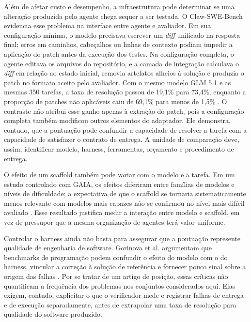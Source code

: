 Além de afetar custo e desempenho, a infraestrutura pode determinar se uma alteração produzida pelo agente chega sequer a ser testada. O Claw-SWE-Bench evidencia esse problema na interface entre agente e avaliador. Em sua configuração mínima, o modelo precisava escrever um \emph{diff} unificado na resposta final; erros em caminhos, cabeçalhos ou linhas de contexto podiam impedir a aplicação do patch antes da execução dos testes. Na configuração completa, o agente editava os arquivos do repositório, e a camada de integração calculava o \emph{diff} em relação ao estado inicial, removia artefatos alheios à solução e produzia o patch no formato aceito pelo avaliador. Com o mesmo modelo GLM 5.1 e as mesmas 350 tarefas, a taxa de resolução passou de 19,1\% para 73,4\%, enquanto a proporção de patches não aplicáveis caiu de 69,1\% para menos de 1,5\% \cite{Zheng2026ClawSWEBench}. O contraste não atribui esse ganho apenas à extração do patch, pois a configuração completa também modificou outros elementos do adaptador. Ele demonstra, contudo, que a pontuação pode confundir a capacidade de resolver a tarefa com a capacidade de satisfazer o contrato de entrega. A unidade de comparação deve, assim, identificar modelo, harness, ferramentas, orçamento e procedimento de entrega.

O efeito de um scaffold também pode variar com o modelo e a tarefa. Em um estudo controlado com GAIA, os efeitos diferiram entre famílias de modelos e níveis de dificuldade; a expectativa de que o scaffold se tornaria sistematicamente menos relevante com modelos mais capazes não se confirmou no nível mais difícil avaliado \cite{Starace2026ScaffoldGAIA}. Esse resultado justifica medir a interação entre modelo e scaffold, em vez de pressupor que a mesma organização de agentes terá valor uniforme.

Controlar o harness ainda não basta para assegurar que a pontuação represente qualidade de engenharia de software. Gorinova et al. argumentam que benchmarks de programação podem confundir o efeito do modelo com o do harness, vincular a correção à solução de referência e fornecer pouco sinal sobre a origem das falhas \cite{Gorinova2026MisalignedBenchmarks}. Por se tratar de um artigo de posição, essas críticas não quantificam a frequência dos problemas nos conjuntos considerados aqui. Elas exigem, contudo, explicitar o que o verificador mede e registrar falhas de entrega e de execução separadamente, antes de extrapolar uma taxa de resolução para qualidade do software produzido.

